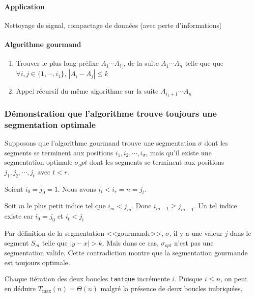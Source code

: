 		\paragraph{Application} Nettoyage de signal, compactage de données (avec perte d'informations)
	
		\paragraph{Algorithme gourmand} 
		\begin{enumerate}
			\item Trouver le plus long préfixe $A_1 \cdots A_{i_1}$, de la suite $A_1\cdots A_n$ telle que que $\forall i,j \in \{1,\cdots,i_1\}$,
				$|A_i-A_j| \leq k$
			\item Appel récursif du même algorithme sur la suite $A_{i_1+1}\cdots A_n$
		\end{enumerate}
	
		\subsubsection{Démonstration que l'algorithme trouve toujours une segmentation optimale}
		Supposons que l'algorithme gourmand trouve une segmentation $\sigma$ dont les segments se terminent aux positions $i_1,i_2,\cdots,i_\sigma$,
		mais qu'il existe une segmentation optimale $\sigma_opt$ dont les segments se terminent aux positions $j_1,j_2,\cdots,j_t$ avec $t < r$.

		Soient $i_0 = j_0 = 1$. Nous avons $i_t < i_r = n = j_t$.
	
		Soit $m$ le plus petit indice tel que $i_m < j_m$. Donc $i_{m-1} \geq j_{m-1}$. Un tel indice existe car $i_0 = j_0$ et $i_t < j_t$


		Par définition de la segmentation <<gourmande>>, $\sigma$, il y a une valeur $j$ dans le segment $S_m$ telle que $|y-x| > k$. 
		Mais dans ce cas, $\sigma_{opt}$ n'est pas une segmentation valide. Cette contradiction montre que la segmentation gourmande est toujours
		optimale.

		
		Chaque itération des deux boucles \texttt{tantque} incrémente $i$. Puisque $i \leq n$, on peut en déduire $T_{\max}(n) = \Theta(n)$ malgré la
		présence de deux boucles imbriquées.
